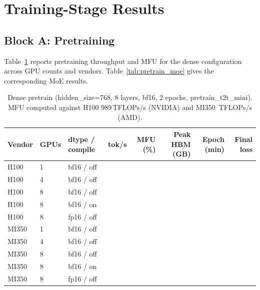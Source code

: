 \section{Training-Stage Results}
\label{sec:training}

\subsection{Block A: Pretraining}
\label{sec:training:pretrain}

Table~\ref{tab:pretrain_dense} reports pretraining throughput and MFU for the
dense configuration across GPU counts and vendors.
Table~\ref{tab:pretrain_moe} gives the corresponding MoE results.

\begin{table}[h]
\centering
\caption{Dense pretrain (hidden\_size=768, 8 layers, bf16, 2 epochs, pretrain\_t2t\_mini).
MFU computed against H100 989\,TFLOPs/s (NVIDIA) and MI350 \,TFLOPs/s (AMD).}
\label{tab:pretrain_dense}
\small
\begin{tabular}{lllrrrrr}
\toprule
\textbf{Vendor} & \textbf{GPUs} & \textbf{dtype / compile} &
\textbf{tok/s} & \textbf{MFU (\%)} & \textbf{Peak HBM (GB)} &
\textbf{Epoch (min)} & \textbf{Final loss} \\
\midrule
H100  & 1 & bf16 / off & \PH{} & \PH{} & \PH{} & \PH{} & \PH{} \\
H100  & 4 & bf16 / off & \PH{} & \PH{} & \PH{} & \PH{} & \PH{} \\
H100  & 8 & bf16 / off & \PH{} & \PH{} & \PH{} & \PH{} & \PH{} \\
H100  & 8 & bf16 / on  & \PH{} & \PH{} & \PH{} & \PH{} & \PH{} \\
H100  & 8 & fp16 / off & \PH{} & \PH{} & \PH{} & \PH{} & \PH{} \\
\midrule
MI350 & 1 & bf16 / off & \PH{} & \PH{} & \PH{} & \PH{} & \PH{} \\
MI350 & 4 & bf16 / off & \PH{} & \PH{} & \PH{} & \PH{} & \PH{} \\
MI350 & 8 & bf16 / off & \PH{} & \PH{} & \PH{} & \PH{} & \PH{} \\
MI350 & 8 & bf16 / on  & \PH{} & \PH{} & \PH{} & \PH{} & \PH{} \\
MI350 & 8 & fp16 / off & \PH{} & \PH{} & \PH{} & \PH{} & \PH{} \\
\bottomrule
\end{tabular}
\end{table}

